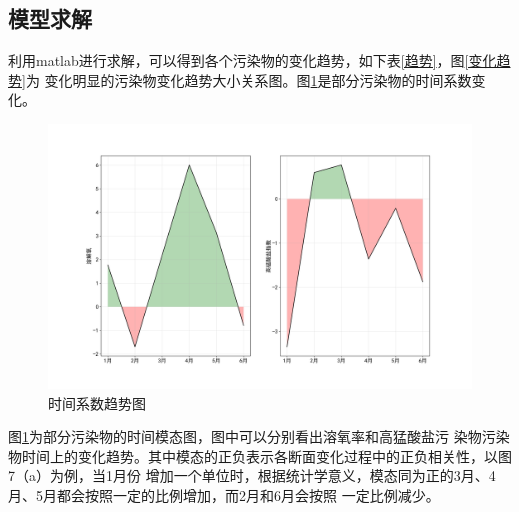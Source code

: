 \documentclass{whutmod}
\begin{document}
\begin{spacing}{1.2}
\subsection{模型求解}	
利用matlab进行求解，可以得到各个污染物的变化趋势，如下表\ref{趋势}，图\ref{变化趋势}为
变化明显的污染物变化趋势大小关系图。图\ref{时间系数}是部分污染物的时间系数变化。


\begin{figure}[H]
	\centering
	\includegraphics[width=.8\textwidth]{时间系数.png}
	\caption{时间系数趋势图}
	\label{时间系数}
\end{figure}

图\ref{时间系数}为部分污染物的时间模态图，图中可以分别看出溶氧率和高猛酸盐污
染物污染物时间上的变化趋势。其中模态的正负表示各断面变化过程中的正负相关性，以图7（a）为例，当1月份
增加一个单位时，根据统计学意义，模态同为正的3月、4月、5月都会按照一定的比例增加，而2月和6月会按照
一定比例减少。


\end{spacing}
\end{document}
